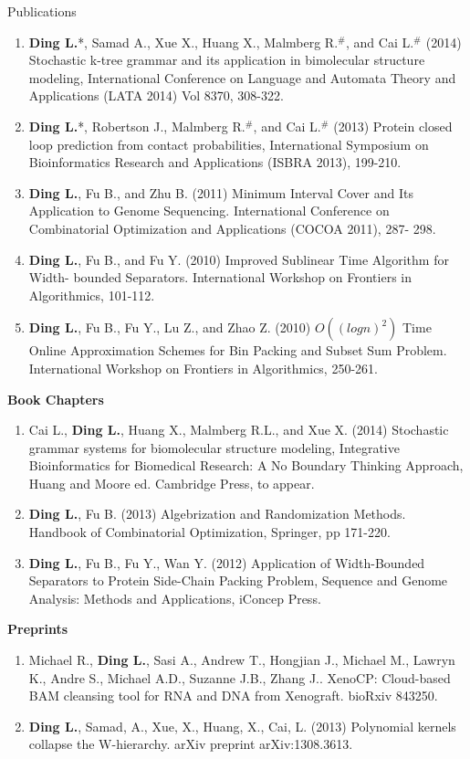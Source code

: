 \documentclass{resume} %
\begin{document}
\begin{rSection}{Publications}
\begin{enumerate}
\item \textbf{Ding L.}*, Samad A., Xue X., Huang X., Malmberg R.$^{\#}$, and Cai L.$^{\#}$ (2014) Stochastic k-tree grammar and its application in bimolecular structure modeling, International Conference on Language and Automata Theory and Applications (LATA 2014) Vol 8370, 308-322.

\item \textbf{Ding L.}*, Robertson J., Malmberg R.$^{\#}$, and Cai L.$^{\#}$ (2013) Protein closed loop prediction from contact probabilities, International Symposium on Bioinformatics Research and Applications (ISBRA 2013), 199-210.

\item \textbf{Ding L.}, Fu B., and Zhu B. (2011) Minimum Interval Cover and Its Application to Genome Sequencing. International Conference on Combinatorial Optimization and Applications (COCOA 2011), 287- 298.

\item \textbf{Ding L.}, Fu B., and Fu Y. (2010) Improved Sublinear Time Algorithm for Width- bounded Separators. International Workshop on Frontiers in Algorithmics, 101-112.

\item \textbf{Ding L.}, Fu B., Fu Y., Lu Z., and Zhao Z. (2010) $O((log n)^2)$ Time Online Approximation Schemes for Bin Packing and Subset Sum Problem. International Workshop on Frontiers in Algorithmics, 250-261.
\end{enumerate}


\textbf{Book Chapters}
\begin{enumerate}
\item Cai L., \textbf{Ding L.}, Huang X., Malmberg R.L., and Xue X. (2014) Stochastic grammar systems for biomolecular structure modeling, Integrative Bioinformatics for Biomedical Research: A No Boundary Thinking Approach, Huang and Moore ed. Cambridge Press, to appear.

\item \textbf{Ding L.}, Fu B. (2013) Algebrization and Randomization Methods. Handbook of Combinatorial Optimization, Springer, pp 171-220.

\item \textbf{Ding L.}, Fu B., Fu Y., Wan Y. (2012) Application of Width-Bounded Separators to Protein Side-Chain Packing Problem, Sequence and Genome Analysis: Methods and Applications, iConcep Press.
\end{enumerate}


\textbf{Preprints}
\begin{enumerate}
\item Michael R., \textbf{Ding L.}, Sasi A., Andrew T., Hongjian J., Michael M., Lawryn K., Andre S., Michael A.D., Suzanne J.B., Zhang J.. XenoCP: Cloud-based BAM cleansing tool for RNA and DNA from Xenograft. bioRxiv 843250.

\item \textbf{Ding L.}, Samad, A., Xue, X., Huang, X., Cai, L. (2013) Polynomial kernels collapse the W-hierarchy. arXiv preprint arXiv:1308.3613.
\end{enumerate}
\end{rSection}
\end{document}
